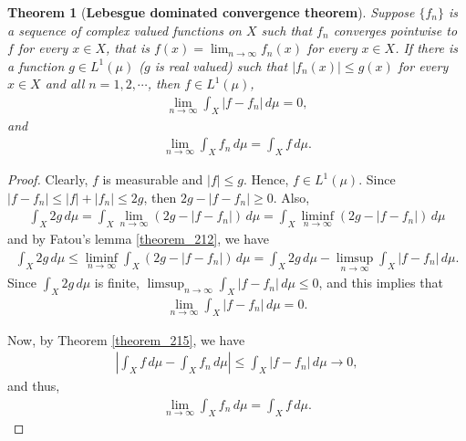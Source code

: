 \documentclass[11pt]{book}
\newtheorem{theorem}{Theorem}[chapter]
\theoremstyle{definition}
\numberwithin{equation}{chapter}
\begin{document}
\begin{theorem}[{\bf Lebesgue dominated convergence theorem}]
Suppose $\{f_n\}$ is a sequence of complex valued functions on $X$ such that $f_n$ converges pointwise to $f$ for every $x\in X$, that is $f(x) = \lim_{n\to\infty}f_n(x)$ for every $x\in X$. If there is a function $g \in L^1(\mu)$ ($g$ is real valued) such that $\left|f_n(x)\right| \leq g(x)$ for every $x \in X$ and all $n = 1,2,\cdots$, then $f \in L^1(\mu)$,
\begin{align*}
    \lim_{n\to\infty} \int_X \left|f - f_n\right|\,d\mu = 0,
\end{align*}
and
\begin{align*}
    \lim_{n\to\infty} \int_X f_n\,d\mu = \int_X f\,d\mu.
\end{align*}
\end{theorem}
\begin{proof}
Clearly, $f$ is measurable and $\left|f\right| \leq g$. Hence, $f \in L^1(\mu)$. Since $\left|f - f_n\right| \leq \left|f\right| + \left|f_n\right| \leq 2g$, then $2g - \left|f - f_n\right| \geq 0$. Also, 
\begin{align*}
    \int_X 2g\,d\mu = \int_X \lim_{n\to\infty} \left(2g - \left|f - f_n\right|\right)\, d\mu = \int_X \liminf_{n\to\infty} \left(2g - \left|f - f_n\right|\right)\, d\mu
\end{align*}
and by Fatou's lemma \ref{theorem_212}, we have
\begin{align*}
    \int_X 2g\,d\mu \leq \liminf_{n\to\infty} \int_X \left(2g - \left|f - f_n\right|\right)\, d\mu = \int_X 2g\,d\mu - \limsup_{n\to\infty} \int_X \left|f - f_n\right|\, d\mu.
\end{align*}
Since $\int_X 2g\,d\mu$ is finite, $\limsup_{n\to\infty} \int_X \left|f - f_n\right|\, d\mu \leq 0$, and this implies that
\begin{align*}
    \lim_{n\to\infty} \int_X \left|f - f_n\right|\, d\mu = 0.
\end{align*}

Now, by Theorem \ref{theorem_215}, we have
\begin{align*}
    \left|\int_X f\,d\mu - \int_X f_n\,d\mu\right| \leq \int_X \left|f - f_n\right|\, d\mu \to 0,
\end{align*}
and thus,
\begin{align*}
    \lim_{n\to\infty} \int_X f_n\,d\mu = \int_X f\,d\mu.
\end{align*}
\end{proof}

\medskip
\end{document}
